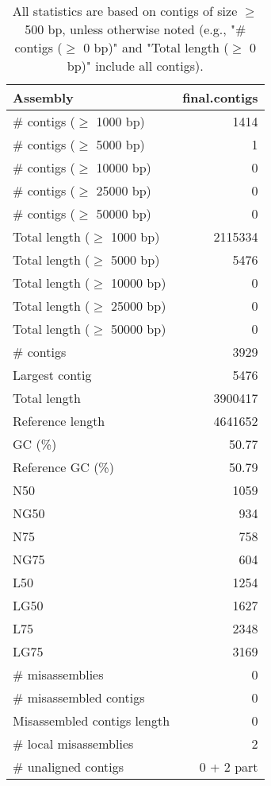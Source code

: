 \documentclass[12pt,a4paper]{article}
\begin{document}
\begin{table}[ht]
\begin{center}
\caption{All statistics are based on contigs of size $\geq$ 500 bp, unless otherwise noted (e.g., "\# contigs ($\geq$ 0 bp)" and "Total length ($\geq$ 0 bp)" include all contigs).}
\begin{tabular}{|l*{1}{|r}|}
\hline
Assembly & final.contigs \\ \hline
\# contigs ($\geq$ 1000 bp) & 1414 \\ \hline
\# contigs ($\geq$ 5000 bp) & 1 \\ \hline
\# contigs ($\geq$ 10000 bp) & 0 \\ \hline
\# contigs ($\geq$ 25000 bp) & 0 \\ \hline
\# contigs ($\geq$ 50000 bp) & 0 \\ \hline
Total length ($\geq$ 1000 bp) & 2115334 \\ \hline
Total length ($\geq$ 5000 bp) & 5476 \\ \hline
Total length ($\geq$ 10000 bp) & 0 \\ \hline
Total length ($\geq$ 25000 bp) & 0 \\ \hline
Total length ($\geq$ 50000 bp) & 0 \\ \hline
\# contigs & 3929 \\ \hline
Largest contig & 5476 \\ \hline
Total length & 3900417 \\ \hline
Reference length & 4641652 \\ \hline
GC (\%) & 50.77 \\ \hline
Reference GC (\%) & 50.79 \\ \hline
N50 & 1059 \\ \hline
NG50 & 934 \\ \hline
N75 & 758 \\ \hline
NG75 & 604 \\ \hline
L50 & 1254 \\ \hline
LG50 & 1627 \\ \hline
L75 & 2348 \\ \hline
LG75 & 3169 \\ \hline
\# misassemblies & 0 \\ \hline
\# misassembled contigs & 0 \\ \hline
Misassembled contigs length & 0 \\ \hline
\# local misassemblies & 2 \\ \hline
\# unaligned contigs & 0 + 2 part \\ \hline

\end{tabular}
\end{center}
\end{table}
\end{document}

